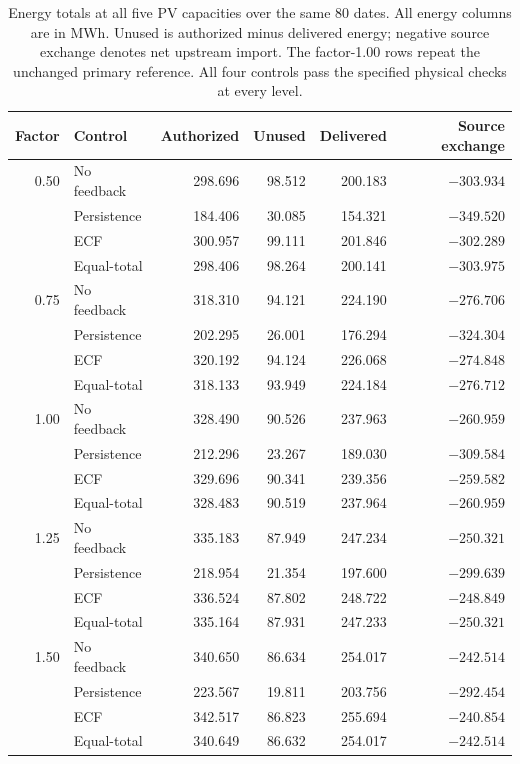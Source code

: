 \documentclass[11pt]{article}
\begin{document}
\begin{table}[!htbp]
\centering
\caption{Energy totals at all five PV capacities over the same 80 dates.
All energy columns are in MWh. Unused is authorized minus delivered energy;
negative source exchange denotes net upstream import. The factor-1.00 rows
repeat the unchanged primary reference. All four controls pass the specified
physical checks at every level.}
\label{tab:supp_pv_energy}
\small
\begin{tabular}{@{}rlrrrr@{}}
\toprule
Factor & Control & Authorized & Unused & Delivered & Source exchange \\
\midrule
0.50 & No feedback & 298.696 & 98.512 & 200.183 & $-303.934$ \\
 & Persistence & 184.406 & 30.085 & 154.321 & $-349.520$ \\
 & ECF & 300.957 & 99.111 & 201.846 & $-302.289$ \\
 & Equal-total & 298.406 & 98.264 & 200.141 & $-303.975$ \\
\midrule
0.75 & No feedback & 318.310 & 94.121 & 224.190 & $-276.706$ \\
 & Persistence & 202.295 & 26.001 & 176.294 & $-324.304$ \\
 & ECF & 320.192 & 94.124 & 226.068 & $-274.848$ \\
 & Equal-total & 318.133 & 93.949 & 224.184 & $-276.712$ \\
\midrule
1.00 & No feedback & 328.490 & 90.526 & 237.963 & $-260.959$ \\
 & Persistence & 212.296 & 23.267 & 189.030 & $-309.584$ \\
 & ECF & 329.696 & 90.341 & 239.356 & $-259.582$ \\
 & Equal-total & 328.483 & 90.519 & 237.964 & $-260.959$ \\
\midrule
1.25 & No feedback & 335.183 & 87.949 & 247.234 & $-250.321$ \\
 & Persistence & 218.954 & 21.354 & 197.600 & $-299.639$ \\
 & ECF & 336.524 & 87.802 & 248.722 & $-248.849$ \\
 & Equal-total & 335.164 & 87.931 & 247.233 & $-250.321$ \\
\midrule
1.50 & No feedback & 340.650 & 86.634 & 254.017 & $-242.514$ \\
 & Persistence & 223.567 & 19.811 & 203.756 & $-292.454$ \\
 & ECF & 342.517 & 86.823 & 255.694 & $-240.854$ \\
 & Equal-total & 340.649 & 86.632 & 254.017 & $-242.514$ \\
\bottomrule
\end{tabular}
\end{table}
\end{document}
